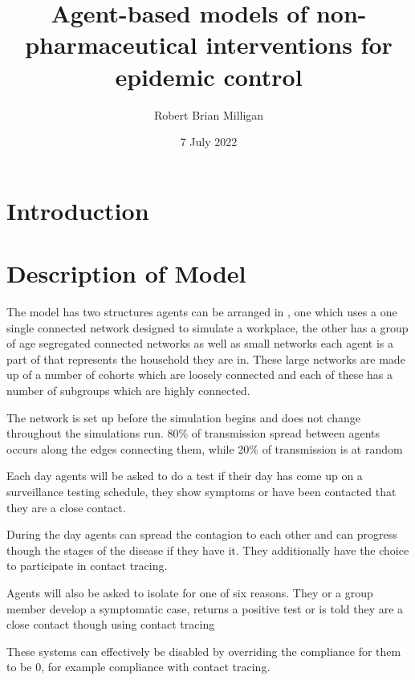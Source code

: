 \documentclass{article}
\title{Agent-based models of non-pharmaceutical interventions for epidemic control}
\author{Robert Brian Milligan}
\date{7 July 2022}
\begin{document}
\maketitle

\section{Introduction}

\section{Description of Model}
The model has two structures agents can be arranged in , one which uses a one single connected network designed to simulate a workplace, the other has a group of age segregated connected networks as well as small networks each agent is a part of that represents the household they are in. These large networks are made up of a number of cohorts which are loosely connected and each of these has a number of subgroups which are highly connected.

The network is set up before the simulation begins and does not change throughout the simulations run. 80\% of transmission spread between agents occurs along the edges connecting them, while 20\% of transmission is at  random

Each day agents will be asked to do a test if their day has come up on a surveillance testing schedule, they show symptoms or have been contacted that they are a close contact.

During the day agents can spread the contagion to each other and can progress though the stages of the disease if they have it. They additionally have the choice to participate in contact tracing.

Agents will also be asked to isolate for one of six reasons. They or a group member develop a symptomatic case, returns a positive test or is told they are a close contact though using contact tracing

These systems can effectively be disabled by overriding the compliance for them to be 0, for example compliance with contact tracing.
\end{document}
